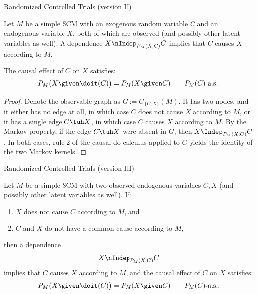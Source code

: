\begin{frame}{Randomized Controlled Trials (version II)}
\begin{Prp}[\ref{prp:RCT2}]
Let $M$ be a simple SCM with an exogenous random variable $C$ and an endogenous 
variable $X$, both of which are observed (and possibly other latent variables as well).
A dependence 
  $X \nIndep_{P_{M}(X,C)} C $
implies that $C$ causes $X$ according to $M$.

The causal effect of $C$ on $X$ satisfies:
  $$P_{M}\big(X \given \doit(C)\big) = P_{M}(X \given C) \qquad P_{M}(C)\text{-a.s.}.$$
\end{Prp}
\begin{proof}
Denote the observable graph as $G := G_{\{C,X\}}(M)$.
It has two nodes, and it either has no edge at all, in which case $C$ does not cause $X$ according to
$M$, or it has a single edge $C \tuh X$, in which case $C$ causes $X$ according to $M$.
By the Markov property, if the edge $C \tuh X$ were absent in $G$, 
then $X \Indep_{P_{M}(X,C)} C$. 
In both cases, rule 2 of the causal do-calculus applied to $G$ yields the identity of the two Markov kernels. 
\end{proof}
\end{frame}

\begin{frame}{Randomized Controlled Trials (version III)}
\begin{Prp}[\ref{prp:RCT3}]
Let $M$ be a simple SCM with two observed endogenous variables $C, X$
(and possibly other latent variables as well). If:
  \begin{enumerate}
    \item $X$ does not cause $C$ according to $M$, and
    \item $C$ and $X$ do not have a common cause according to $M$,
  \end{enumerate}
then a dependence 
  $$X \nIndep_{P_{M}(X,C)} C$$
  implies that $C$ causes $X$ according to $M$, and the causal effect of $C$ on $X$ satisfies:
  $$P_{M}\big(X \given \doit(C)\big) = P_{M}(X \given C) \qquad P_{M}(C)\text{-a.s.}.$$
\end{Prp}
\end{frame}

